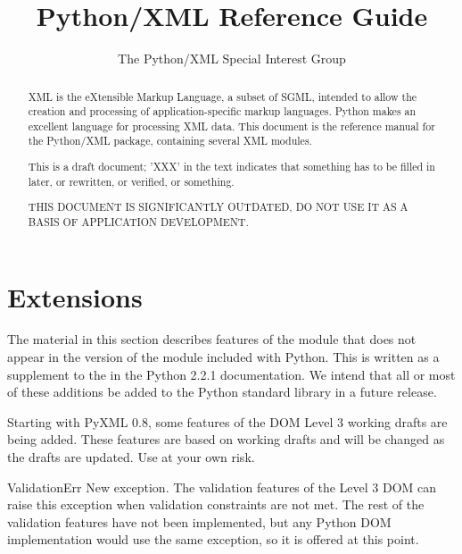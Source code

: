 \documentclass{howto}
\title{Python/XML Reference Guide}
\author{The Python/XML Special Interest Group}
\begin{document}
\maketitle

\begin{abstract}
\noindent
XML is the eXtensible Markup Language, a subset of SGML, intended to
allow the creation and processing of application-specific markup
languages.  Python makes an excellent language for processing XML
data.  This document is the reference manual for the Python/XML
package, containing several XML modules.

This is a draft document; 'XXX' in the text indicates that something
has to be filled in later, or rewritten, or verified, or something.  

   THIS DOCUMENT IS SIGNIFICANTLY OUTDATED, DO NOT USE IT AS A BASIS OF
   APPLICATION DEVELOPMENT.

\end{abstract}

\tableofcontents

\section{ Extensions}


\begin{notice}
  The material in this section describes features of the
   module that does not appear in the version of the
  module included with Python.  This is written as a supplement to the
   in
  the Python 2.2.1 documentation.  We intend that all or most of these
  additions be added to the Python standard library in a future
  release.
\end{notice}

Starting with PyXML 0.8, some features of the DOM Level 3 working
drafts are being added.  These features are based on working drafts
and will be changed as the drafts are updated.  Use at your own risk.

\begin{excdesc}{ValidationErr}
  New exception.  The validation features of the Level 3 DOM can raise
  this exception when validation constraints are not met.  The rest of
  the validation features have not been implemented, but any Python
  DOM implementation would use the same exception, so it is offered at
  this point.
\end{excdesc}
\end{document}

